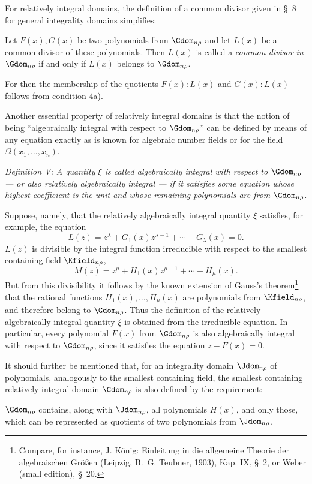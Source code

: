 \documentclass[11pt]{article}
\begin{document}
For relatively integral domains, the definition of a common divisor given in \S\ 8 for general integrality domains simplifies:

Let $F(x),G(x)$ be two polynomials from $\Gdom_{n\rho}$ and let $L(x)$ be a common divisor of these polynomials. Then $L(x)$ is called a \emph{common divisor in $\Gdom_{n\rho}$} if and only if $L(x)$ belongs to $\Gdom_{n\rho}$.

For then the membership of the quotients $F(x):L(x)$ and $G(x):L(x)$ follows from condition 4a).

Another essential property of relatively integral domains is that the notion of being ``algebraically integral with respect to $\Gdom_{n\rho}$'' can be defined by means of any equation exactly as is known for algebraic number fields or for the field $\Omega(x_1,
\ldots,x_n)$.

\emph{Definition V: A quantity $\xi$ is called algebraically integral with respect to $\Gdom_{n\rho}$ --- or also relatively algebraically integral --- if it satisfies some equation whose highest coefficient is the unit and whose remaining polynomials are from $\Gdom_{n\rho}$.}

Suppose, namely, that the relatively algebraically integral quantity $\xi$ satisfies, for example, the equation
\[
  L(z)=z^\lambda+G_1(x)z^{\lambda-1}+\cdots+G_\lambda(x)=0.
\]
$L(z)$ is divisible by the integral function irreducible with respect to the smallest containing field $\Kfield_{n\rho}$,
\[
  M(z)=z^\mu+H_1(x)z^{\mu-1}+\cdots+H_\mu(x).
\]
But from this divisibility it follows by the known extension of Gauss's theorem\footnote{Compare, for instance, J. König: Einleitung in die allgemeine Theorie der algebraischen Größen (Leipzig, B.~G. Teubner, 1903), Kap. IX, \S\ 2, or Weber (small edition), \S\ 20.} that the rational functions $H_1(x),\ldots,H_\mu(x)$ are polynomials from $\Kfield_{n\rho}$, and therefore belong to $\Gdom_{n\rho}$. Thus the definition of the relatively algebraically integral quantity $\xi$ is obtained from the irreducible equation. In particular, every polynomial $F(x)$ from $\Gdom_{n\rho}$ is also algebraically integral with respect to $\Gdom_{n\rho}$, since it satisfies the equation $z-F(x)=0$.

It should further be mentioned that, for an integrality domain $\Jdom_{n\rho}$ of polynomials, analogously to the smallest containing field, the smallest containing relatively integral domain $\Gdom_{n\rho}$ is also defined by the requirement:

$\Gdom_{n\rho}$ contains, along with $\Jdom_{n\rho}$, all polynomials $H(x)$, and only those, which can be represented as quotients of two polynomials from $\Jdom_{n\rho}$.
\end{document}
